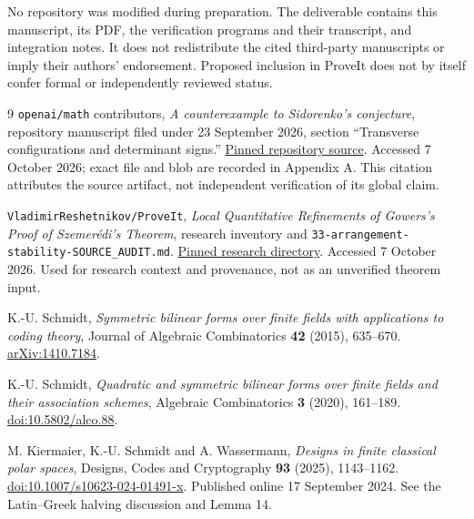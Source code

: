 \documentclass[11pt,a4paper]{article}
\theoremstyle{definition}
\theoremstyle{remark}
\begin{document}
No repository was modified during preparation. The deliverable contains
this manuscript, its PDF, the verification programs and their transcript,
and integration notes. It does not redistribute the cited third-party
manuscripts or imply their authors' endorsement. Proposed inclusion in
ProveIt does not by itself confer formal or independently reviewed status.

\clearpage
\begin{thebibliography}{9}
\texttt{openai/math} contributors,
\emph{A counterexample to Sidorenko's conjecture}, repository manuscript
filed under 23 September 2026, section ``Transverse configurations and
determinant signs.''
\href{https://github.com/openai/math/tree/adc7f1241b42e322a6451854ab7e4b4c146bf78a/preprints/A-counterexample-to-Sidorenkos-conjecture-September-23-2026}{Pinned repository source}.
Accessed 7 October 2026; exact file and blob are recorded in Appendix A.
This citation attributes the source artifact, not independent verification
of its global claim.

\texttt{VladimirReshetnikov/ProveIt},
\emph{Local Quantitative Refinements of Gowers's Proof of Szemer\'edi's
Theorem}, research inventory and
\texttt{33-arrangement-stability-SOURCE\_AUDIT.md}.
\href{https://github.com/VladimirReshetnikov/ProveIt/tree/a41aa448d67395387593f1931cda142836afccdc/Combinatorics/Ramsey/Research/GowersSzemeredi/local-quantitative-refinements}{Pinned research directory}.
Accessed 7 October 2026. Used for research context and provenance, not as
an unverified theorem input.

K.-U. Schmidt,
\emph{Symmetric bilinear forms over finite fields with applications to
coding theory}, Journal of Algebraic Combinatorics \textbf{42} (2015),
635--670. \href{https://arxiv.org/abs/1410.7184}{arXiv:1410.7184}.

K.-U. Schmidt,
\emph{Quadratic and symmetric bilinear forms over finite fields and their
association schemes}, Algebraic Combinatorics \textbf{3} (2020), 161--189.
\href{https://doi.org/10.5802/alco.88}{doi:10.5802/alco.88}.

M. Kiermaier, K.-U. Schmidt and A. Wassermann,
\emph{Designs in finite classical polar spaces}, Designs, Codes and
Cryptography \textbf{93} (2025), 1143--1162.
\href{https://doi.org/10.1007/s10623-024-01491-x}{doi:10.1007/s10623-024-01491-x}.
Published online 17 September 2024. See the Latin--Greek halving discussion
and Lemma 14.
\end{thebibliography}
\end{document}
